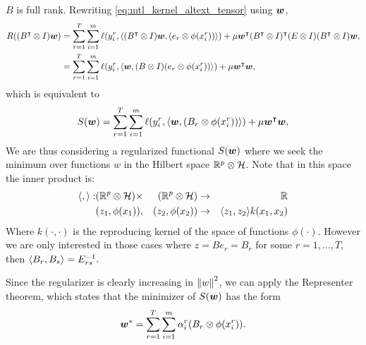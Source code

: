 $B$ is full rank. Rewriting \eqref{eq:mtl_kernel_altext_tensor} using $\bm{w}$,
\begin{equation}
    \nonumber
    \begin{aligned}
        R((B^\intercal \otimes I) \bm{w}) &= \sum_{r=1}^{T} \sum_{i=1}^m \ell(y_i^r, \langle (B^\intercal \otimes I) \bm{w},  (e_r \otimes \phi(x_i^r)) \rangle) + \mu  \bm{w}^\intercal (B^\intercal \otimes I)^\intercal (E \otimes I) (B^\intercal \otimes I)\bm{w} ,\\
        &= \sum_{r=1}^{T} \sum_{i=1}^m \ell(y_i^r, \langle \bm{w}, (B \otimes I) (e_r \otimes \phi(x_i^r)) \rangle) + \mu  \bm{w}^\intercal \bm{w} ,\\
    \end{aligned}
\end{equation}
which is equivalent to
\begin{equation}
    \nonumber
    \begin{aligned}
        &S(\bm{w}) = \sum_{r=1}^{T} \sum_{i=1}^m \ell(y_i^r, \langle \bm{w}, (B_r \otimes \phi(x_i^r)) \rangle) + \mu  \bm{w}^\intercal \bm{w} ,\\
    \end{aligned}
\end{equation}
We are thus considering a regularized functional $S(\bm{w})$ where we seek the minimum over functions $w$ in the Hilbert space $\mathbb{R}^p \otimes \mathcal{H}$. Note that in this space the inner product is:
\begin{equation}
    \nonumber
    \begin{aligned}
        \langle ,  \rangle: &(\mathbb{R}^p \otimes \mathcal{H}) \times &(\mathbb{R}^p \otimes \mathcal{H}) &\to &\mathbb{R} \\
    &(z_1, \phi(x_1)), &(z_2, \phi(x_2)) &\to &\langle z_1, z_2 \rangle k(x_1, x_2)
    \end{aligned}
\end{equation}
Where $k(\cdot, \cdot)$ is the reproducing kernel of the space of functions $\phi(\cdot)$.
However we are only interested in those cases where $z = B e_r = B_r$ for some $r=1, \ldots, T$, then $\langle B_r, B_s \rangle = E^{-1}_{rs}.$

Since the regularizer is clearly increasing in $\left\lVert w\right\rVert^2$, we can apply the Representer theorem, which states that the minimizer of $S(\bm{w})$ has the form
\begin{equation}
    \nonumber
    \bm{w}^* = \sum_{r=1}^T \sum_{i=1}^m \alpha_i^r (B_r \otimes \phi(x_i^r)) .
\end{equation}

